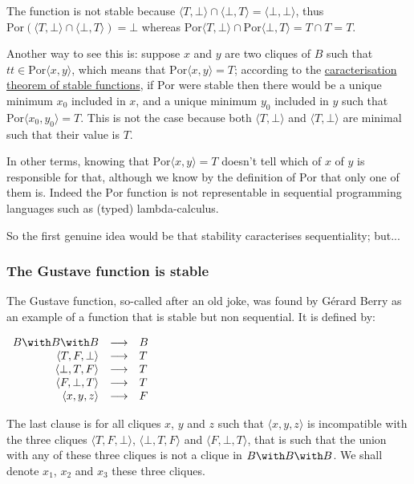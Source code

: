 The function is not stable because
\(\langle T,\bot\rangle \cap \langle \bot, T\rangle = \langle\bot, \bot\rangle\),
thus
\(\mathrm{Por}(\langle T,\bot\rangle \cap \langle \bot, T\rangle) = \bot\)
whereas
\(\mathrm{Por}\langle T,\bot\rangle \cap \mathrm{Por}\langle \bot, T\rangle = T\cap T = T\).

Another way to see this is: suppose \(x\) and \(y\) are two cliques of
\(B\) such that \(tt\in \mathrm{Por}\langle x, y\rangle\), which means
that \(\mathrm{Por}\langle x, y\rangle = T\); according to the
\protect\hyperlink{Stable_functions}{caracterisation theorem of stable
functions}, if \(\mathrm{Por}\) were stable then there would be a unique
minimum \(x_0\) included in \(x\), and a unique minimum \(y_0\) included
in \(y\) such that \(\mathrm{Por}\langle x_0, y_0\rangle = T\). This is
not the case because both \(\langle T,\bot\rangle\) and
\(\langle T,\bot\rangle\) are minimal such that their value is \(T\).

In other terms, knowing that \(\mathrm{Por}\langle x, y\rangle = T\)
doesn't tell which of \(x\) of \(y\) is responsible for that, although
we know by the definition of \(\mathrm{Por}\) that only one of them is.
Indeed the \(\mathrm{Por}\) function is not representable in sequential
programming languages such as (typed) lambda-calculus.

So the first genuine idea would be that stability caracterises
sequentiality; but...

\subsubsection{The Gustave function is stable}\label{the-gustave-function-is-stable}

The Gustave function, so-called after an old joke, was found by Gérard
Berry as an example of a function that is stable but non sequential. It
is defined by:

\(\begin{array}{rcl}
  B\with B\with B           & \longrightarrow&  B\\
  \langle T, F, \bot\rangle & \longrightarrow&  T\\
  \langle \bot, T, F\rangle & \longrightarrow&  T\\
  \langle F, \bot, T\rangle & \longrightarrow&  T\\
  \langle x, y, z\rangle    & \longrightarrow&  F
\end{array}\)

The last clause is for all cliques \(x\), \(y\) and \(z\) such that
\(\langle x, y ,z\rangle\) is incompatible with the three cliques
\(\langle T, F, \bot\rangle\), \(\langle \bot, T, F\rangle\) and
\(\langle F, \bot, T\rangle\), that is such that the union with any of
these three cliques is not a clique in \(B\with B\with B\). We shall
denote \(x_1\), \(x_2\) and \(x_3\) these three cliques.

